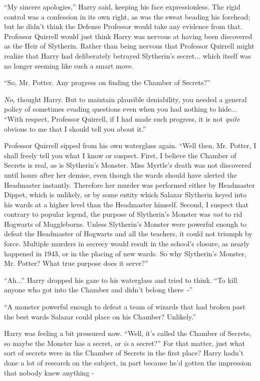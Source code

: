 ``My sincere apologies,'' Harry said, keeping his face expressionless. The rigid control was a confession in its own right, as was the sweat beading his forehead; but he didn't think the Defense Professor would take any evidence from that. Professor Quirrell would just think Harry was nervous at having been discovered as the Heir of Slytherin. Rather than being nervous that Professor Quirrell might realize that Harry had deliberately betrayed Slytherin's secret... which itself was no longer seeming like such a smart move.

``So, Mr. Potter. Any progress on finding the Chamber of Secrets?''

\emph{No,} thought Harry. But to maintain plausible deniability, you needed a general policy of sometimes evading questions even when you had nothing to hide... ``With respect, Professor Quirrell, if I had made such progress, it is not \emph{quite} obvious to me that I should tell you about it.''

Professor Quirrell sipped from his own waterglass again. ``Well then, Mr. Potter, I shall freely tell you what I know or suspect. First, I believe the Chamber of Secrets is real, as is Slytherin's Monster. Miss Myrtle's death was not discovered until hours after her demise, even though the wards should have alerted the Headmaster instantly. Therefore her murder was performed either by Headmaster Dippet, which is unlikely, or by some entity which Salazar Slytherin keyed into his wards at a higher level than the Headmaster himself. Second, I suspect that contrary to popular legend, the purpose of Slytherin's Monster was \emph{not} to rid Hogwarts of Muggleborns. Unless Slytherin's Monster were powerful enough to defeat the Headmaster of Hogwarts and all the teachers, it could not triumph by force. Multiple murders in secrecy would result in the school's closure, as nearly happened in 1943, or in the placing of new wards. So why Slytherin's Monster, Mr. Potter? What true purpose does it serve?''

``Ah...'' Harry dropped his gaze to his waterglass and tried to think. ``To kill anyone who got into the Chamber and didn't belong there~-''

``A monster powerful enough to defeat a team of wizards that had broken past the best wards Salazar could place on his Chamber? Unlikely.''

Harry was feeling a bit pressured now. ``Well, it's called the Chamber of Secrets, so maybe the Monster has a secret, or \emph{is} a secret?'' For that matter, just what sort of secrets were in the Chamber of Secrets in the first place? Harry hadn't done a lot of research on the subject, in part because he'd gotten the impression that nobody knew anything -

